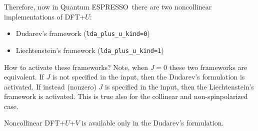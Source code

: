 \documentclass[12pt,a4paper]{article}
\def\qe{{\sc Quantum ESPRESSO}}
\begin{document}
Therefore, now in \qe\ there are two noncollinear implementations of DFT+$U$: 
\begin{itemize}
 \item Dudarev's framework (\texttt{lda\_plus\_u\_kind=0})
 \item Liechtenstein's framework (\texttt{lda\_plus\_u\_kind=1})
\end{itemize}
How to activate these frameworks? Note, when $J=0$ these two frameworks are equivalent. If $J$ is not specified in the input, then the Dudarev's formulation is activated. If instead (nonzero) $J$ is specified in the input, then the Liechtenstein's framework is activated. This is true also for the collinear and non-spinpolarized case. 

Noncollinear DFT+$U$+$V$ is available only in the Dudarev's formulation. 
\end{document}
